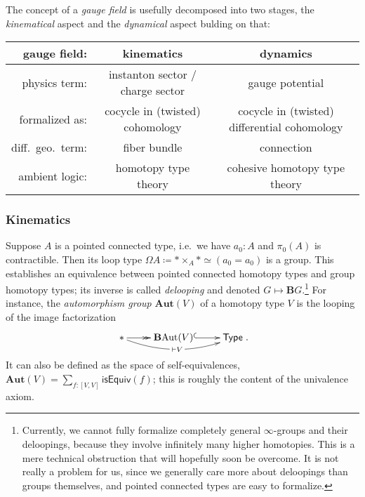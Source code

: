 \documentclass[copyright,12pt]{eptcs}
\newcommand{\type}{\ensuremath{\mathsf{Type}}\xspace}
\begin{document}
The concept of a \emph{gauge field} is usefully decomposed into two stages, the \emph{kinematical}
aspect and the \emph{dynamical} aspect bulding on that:

\bigskip
{\footnotesize
\hspace{-.6cm}
\begin{tabular}{|r||c|c|}
  \hline
  {\bf gauge field:} & {\bf kinematics} & {\bf dynamics}
  \\
  \hline
  \hline
  physics  term: &
  instanton sector / charge sector
  & gauge potential
  \\
  \hline
  formalized as: & cocycle in (twisted) cohomology & cocycle in (twisted) differential cohomology
  \\
  \hline
     diff.\ geo.\
     term:
  &
  fiber bundle
  &
  connection
  \\
  \hline
  ambient logic:
  & homotopy type theory & cohesive homotopy type theory
  \\
  \hline
\end{tabular}
}

\subsubsection{Kinematics}

Suppose $A$ is a pointed connected type, i.e.\ we have $a_0:A$ and $\pi_0(A)$ is contractible.
Then its loop type $\Omega A \coloneqq * \times_A * \simeq (a_0 = a_0)$ is
a group. This establishes an equivalence between pointed connected homotopy types and
group homotopy types; its inverse is called
\emph{delooping} and denoted $G \mapsto \mathbf{B}G$.\footnote{Currently, we cannot fully formalize completely general $\infty$-groups and their deloopings, because they involve infinitely many higher homotopies.  This is a mere technical obstruction that will hopefully soon be overcome.
It is not really a problem for us, since we generally care more about deloopings than groups themselves, and pointed connected types are easy to formalize.}
For instance, the
\emph{automorphism group} $\mathbf{Aut}(V)$ of a homotopy type $V$ is the looping of the image factorization
\[\xymatrix{
    {*} \ar@{->>}[r] \ar@/_1pc/[rr]|{\;\vdash V\;} & \mathbf{B}\mathrm{Aut}(V) \ar@{^{(}->}[r] & \type
  }.\]
It can also be defined as the space of self-equivalences, $\mathbf{Aut}(V) = \sum_{f:[V,V]}\mathsf{isEquiv}(f)$; this is roughly the content of the univalence axiom.
\end{document}
